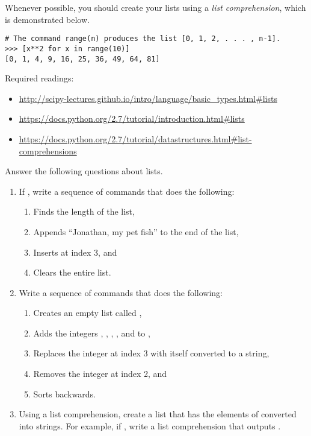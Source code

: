 Whenever possible, you should create your lists using a \emph{list comprehension}, which is demonstrated below.
\begin{lstlisting}
# The command range(n) produces the list [0, 1, 2, . . . , n-1].
>>> [x**2 for x in range(10)]
[0, 1, 4, 9, 16, 25, 36, 49, 64, 81]
\end{lstlisting}



Required readings: 
\begin{itemize}
\item \url{http://scipy-lectures.github.io/intro/language/basic_types.html#lists} 
\item \url{https://docs.python.org/2.7/tutorial/introduction.html#lists}
\item \url{https://docs.python.org/2.7/tutorial/datastructures.html#list-comprehensions}
\end{itemize}

\begin{problem}
Answer the following questions about lists.

\begin{enumerate}
\item If , write a sequence of commands that does the following:
\begin{enumerate}
\item Finds the length of the list,
\item Appends ``Jonathan, my pet fish'' to the end of the list,
\item Inserts  at index 3, and
\item Clears the entire list.
\end{enumerate}
\item Write a sequence of commands that does the following:
\begin{enumerate}
\item Creates an empty list called ,
\item Adds the integers , , , , and  to ,
\item Replaces the integer at index 3 with itself converted to a string,
\item Removes the integer at index 2, and
\item Sorts  backwards.
\end{enumerate}
\item Using a list comprehension, create a list that has the elements of  converted into strings. For example, if , write a list comprehension that outputs .
\end{enumerate}

\end{problem}


